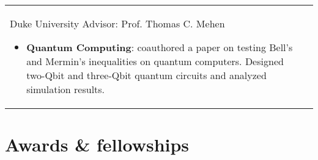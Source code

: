 \documentclass[10pt]{article} %
\begin{document}
\begin{longtable}{L{4cm}@{\hskip 0.15in}L{13.5cm}}
{\normalsize Duke University} %
{Advisor: Prof. Thomas C. Mehen} %
{\begin{itemize}
\vspace{-0.4cm}
 \item \textbf{Quantum Computing}: coauthored a paper on testing  Bell's and Mermin's inequalities on quantum computers. Designed two-Qbit and three-Qbit quantum circuits and analyzed simulation results.
 \end{itemize}}  %


\end{longtable}

\vspace*{1mm} %



\section{Awards \& fellowships}





	
 \vspace{-0.4cm}
\end{document}
